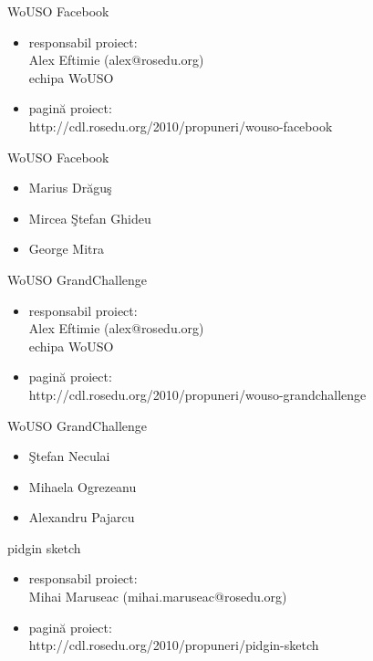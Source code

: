 \documentclass{beamer}
\begin{document}
\begin{frame}{WoUSO Facebook}
  \begin{itemize} %
  \pause
  \item responsabil proiect: \\ Alex Eftimie (alex@rosedu.org) \\ echipa WoUSO
  \pause
  \item pagină proiect: \\ http://cdl.rosedu.org/2010/propuneri/wouso-facebook
  \end{itemize}
\end{frame}

\begin{frame}{WoUSO Facebook}
  \begin{itemize} %
  \pause
  \item Marius Drăguş
  \pause
  \item Mircea Ştefan Ghideu
  \pause
  \item George Mitra
  \end{itemize}
\end{frame}

\begin{frame}{WoUSO GrandChallenge}
  \begin{itemize} %
  \pause
  \item responsabil proiect: \\ Alex Eftimie (alex@rosedu.org) \\ echipa WoUSO
  \pause
  \item pagină proiect: \\ http://cdl.rosedu.org/2010/propuneri/wouso-grandchallenge
  \end{itemize}
\end{frame}

\begin{frame}{WoUSO GrandChallenge}
  \begin{itemize} %
  \pause
  \item Ştefan Neculai
  \pause
  \item Mihaela Ogrezeanu
  \pause
  \item Alexandru Pajarcu
  \end{itemize}
\end{frame}

\begin{frame}{pidgin sketch}
  \begin{itemize} %
  \pause
  \item responsabil proiect: \\ Mihai Maruseac (mihai.maruseac@rosedu.org)
  \pause
  \item pagină proiect: \\ http://cdl.rosedu.org/2010/propuneri/pidgin-sketch
  \end{itemize}
\end{frame}
\end{document}
